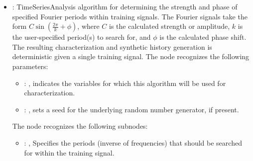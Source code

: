 \begin{itemize}
    \item {}:
      TimeSeriesAnalysis algorithm for determining the strength and phase of
      specified Fourier periods within training signals. The Fourier signals take
      the form $C\sin(\frac{2\pi}{k}+\phi)$, where $C$ is the calculated strength
      or amplitude, $k$ is the user-specified period(s) to search for, and $\phi$
      is the calculated phase shift. The resulting characterization and synthetic
      history generation is deterministic given a single training signal.
      The  node recognizes the following parameters:
        \begin{itemize}
          \item {}: , 
            indicates the variables for which this algorithm will be used for characterization.
          \item {}: , 
            sets a seed for the underlying random number generator, if present.
      \end{itemize}

      The  node recognizes the following subnodes:
      \begin{itemize}
        \item {}: , 
          Specifies the periods (inverse of frequencies) that should be searched
          for within the training signal.
      \end{itemize}


\end{itemize}
